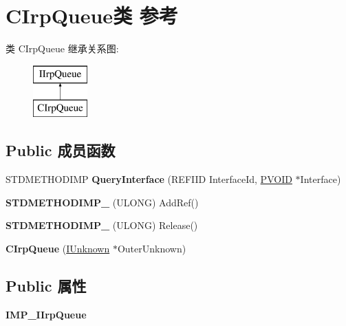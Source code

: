 \hypertarget{class_c_irp_queue}{}\section{C\+Irp\+Queue类 参考}
\label{class_c_irp_queue}
类 C\+Irp\+Queue 继承关系图\+:\begin{figure}[H]
\begin{center}
\leavevmode
\includegraphics[height=2.000000cm]{class_c_irp_queue}
\end{center}
\end{figure}
\subsection*{Public 成员函数}
\begin{DoxyCompactItemize}
\item 
\mbox{\label{class_c_irp_queue_a1893e9d6d0c66f8d8108f79b66530e41}} 
S\+T\+D\+M\+E\+T\+H\+O\+D\+I\+MP {\bfseries Query\+Interface} (R\+E\+F\+I\+ID Interface\+Id, \hyperlink{interfacevoid}{P\+V\+O\+ID} $\ast$Interface)
\item 
\mbox{\label{class_c_irp_queue_a0f9720e1a1d24753d7a492b6d5e7fa94}} 
{\bfseries S\+T\+D\+M\+E\+T\+H\+O\+D\+I\+M\+P\+\_\+} (U\+L\+O\+NG) Add\+Ref()
\item 
\mbox{\label{class_c_irp_queue_a5e4f869504433ce2364c9e5b7def57bf}} 
{\bfseries S\+T\+D\+M\+E\+T\+H\+O\+D\+I\+M\+P\+\_\+} (U\+L\+O\+NG) Release()
\item 
\mbox{\label{class_c_irp_queue_a3dd41182b506c6701702e03c5dc7f000}} 
{\bfseries C\+Irp\+Queue} (\hyperlink{interface_i_unknown}{I\+Unknown} $\ast$Outer\+Unknown)
\end{DoxyCompactItemize}
\subsection*{Public 属性}
\begin{DoxyCompactItemize}
\item 
\mbox{\label{class_c_irp_queue_aac9a5b51ca35d67e6dfeade66c77bd34}} 
{\bfseries I\+M\+P\+\_\+\+I\+Irp\+Queue}
\end{DoxyCompactItemize}
